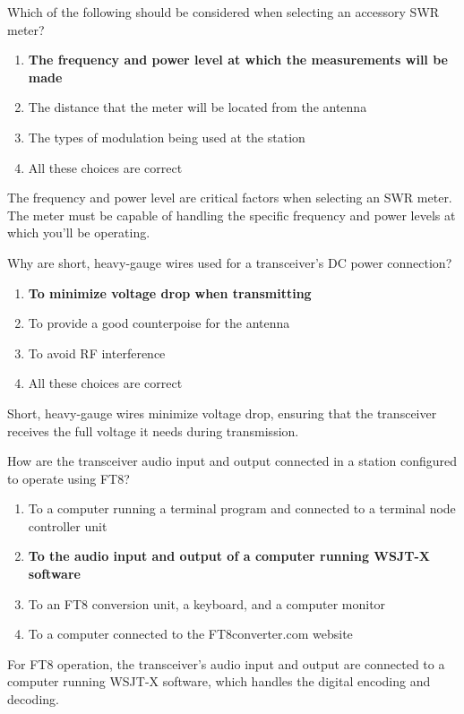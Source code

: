 \begin{tcolorbox}[colback=gray!10!white,colframe=black!75!black,title={T4A02}]
    Which of the following should be considered when selecting an accessory SWR meter?
    \begin{enumerate}[label=\Alph*),noitemsep]
        \item \textbf{The frequency and power level at which the measurements will be made}
        \item The distance that the meter will be located from the antenna
        \item The types of modulation being used at the station
        \item All these choices are correct
    \end{enumerate}
\end{tcolorbox}
The frequency and power level are critical factors when selecting an SWR meter. The meter must be capable of handling the specific frequency and power levels at which you'll be operating.

\begin{tcolorbox}[colback=gray!10!white,colframe=black!75!black,title={T4A03}]
    Why are short, heavy-gauge wires used for a transceiver’s DC power connection?
    \begin{enumerate}[label=\Alph*),noitemsep]
        \item \textbf{To minimize voltage drop when transmitting}
        \item To provide a good counterpoise for the antenna
        \item To avoid RF interference
        \item All these choices are correct
    \end{enumerate}
\end{tcolorbox}
Short, heavy-gauge wires minimize voltage drop, ensuring that the transceiver receives the full voltage it needs during transmission.

\begin{tcolorbox}[colback=gray!10!white,colframe=black!75!black,title={T4A04}]
    How are the transceiver audio input and output connected in a station configured to operate using FT8?
    \begin{enumerate}[label=\Alph*),noitemsep]
        \item To a computer running a terminal program and connected to a terminal node controller unit
        \item \textbf{To the audio input and output of a computer running WSJT-X software}
        \item To an FT8 conversion unit, a keyboard, and a computer monitor
        \item To a computer connected to the FT8converter.com website
    \end{enumerate}
\end{tcolorbox}
For FT8 operation, the transceiver's audio input and output are connected to a computer running WSJT-X software, which handles the digital encoding and decoding.

